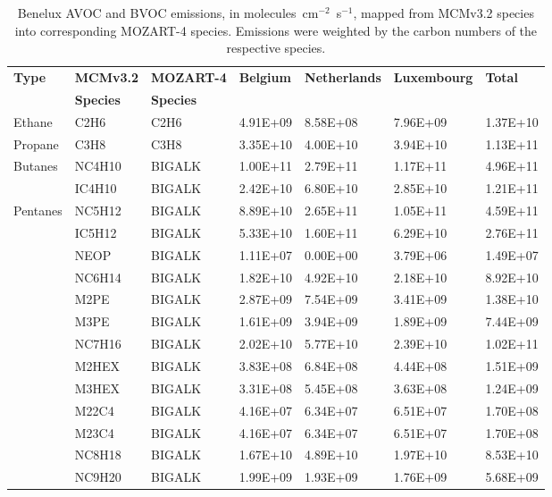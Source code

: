 \footnotesize
\begin{longtable}{lllllll}
	\caption{Benelux AVOC and BVOC emissions, in molecules~cm$^{-2}$~s$^{-1}$, mapped from MCMv3.2 species into corresponding MOZART-4 species. Emissions were weighted by the carbon numbers of the respective species.}\\%
	\hline \hline
	\multirow{2}{*}{\textbf{Type}} & \textbf{MCMv3.2} & \textbf{MOZART-4} & \multirow{2}{*}{\textbf{Belgium}} & \multirow{2}{*}{\textbf{Netherlands}} & \multirow{2}{*}{\textbf{Luxembourg}} & \multirow{2}{*}{\textbf{Total}} \\
 & \textbf{Species} & \textbf{Species} & & & & \\
	\endhead
	\hline
	Ethane & C2H6 & C2H6 & 4.91E+09 & 8.58E+08 & 7.96E+09 & 1.37E+10 \\
	\hline Propane & C3H8 & C3H8 & 3.35E+10 & 4.00E+10 & 3.94E+10 & 1.13E+11 \\ \hline
	\multirow{2}{*}{Butanes} & NC4H10 & BIGALK & 1.00E+11 & 2.79E+11 & 1.17E+11 & 4.96E+11 \\
	 & IC4H10 & BIGALK & 2.42E+10 & 6.80E+10 & 2.85E+10 & 1.21E+11 \\
	\hline \multirow{3}{*}{Pentanes} & NC5H12 & BIGALK & 8.89E+10 & 2.65E+11 & 1.05E+11 & 4.59E+11 \\
	 & IC5H12 & BIGALK & 5.33E+10 & 1.60E+11 & 6.29E+10 & 2.76E+11 \\
	 & NEOP & BIGALK & 1.11E+07 & 0.00E+00 & 3.79E+06 & 1.49E+07 \\
	\hline \parbox[t]{2mm}{} & NC6H14 & BIGALK & 1.82E+10 & 4.92E+10 & 2.18E+10 & 8.92E+10 \\
	 & M2PE & BIGALK & 2.87E+09 & 7.54E+09 & 3.41E+09 & 1.38E+10 \\
	 & M3PE & BIGALK & 1.61E+09 & 3.94E+09 & 1.89E+09 & 7.44E+09 \\
	 & NC7H16 & BIGALK & 2.02E+10 & 5.77E+10 & 2.39E+10 & 1.02E+11 \\
	 & M2HEX & BIGALK & 3.83E+08 & 6.84E+08 & 4.44E+08 & 1.51E+09 \\
	 & M3HEX & BIGALK & 3.31E+08 & 5.45E+08 & 3.63E+08 & 1.24E+09 \\
	 & M22C4 & BIGALK & 4.16E+07 & 6.34E+07 & 6.51E+07 & 1.70E+08 \\
	 & M23C4 & BIGALK & 4.16E+07 & 6.34E+07 & 6.51E+07 & 1.70E+08 \\
	 & NC8H18 & BIGALK & 1.67E+10 & 4.89E+10 & 1.97E+10 & 8.53E+10 \\
	 & NC9H20 & BIGALK & 1.99E+09 & 1.93E+09 & 1.76E+09 & 5.68E+09 \\

\end{longtable}
